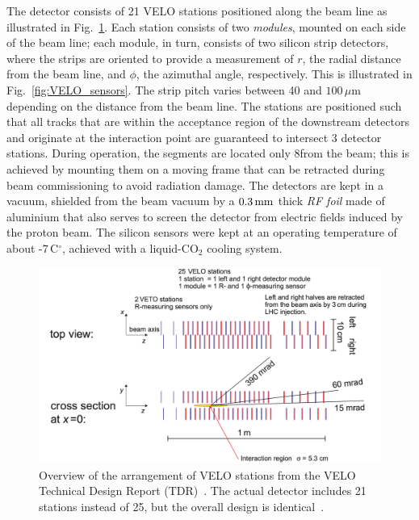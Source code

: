 The detector consists of 21 VELO stations positioned along the beam line as illustrated in Fig.~\ref{fig:VELO_stations}. Each station consists of two \emph{modules}, mounted on each side of the beam line; each module, in turn, consists of two silicon strip detectors,  where the strips are oriented to provide a measurement of $r$, the radial distance from the beam line, and  $\phi$, the azimuthal angle, respectively. This is illustrated in Fig.~\ref{fig:VELO_sensors}. The strip pitch varies between 40 and $100\,\mu$m depending on the distance from the beam line.  The stations are positioned such that all tracks that are within the acceptance region of the downstream detectors and originate at the interaction point are guaranteed to intersect 3 detector stations. During operation, the segments are located only 8\mm from the beam; this is achieved by mounting them on a moving frame that can be retracted during beam commissioning to avoid radiation damage. The detectors are kept in a vacuum, shielded from the beam vacuum by a $0.3\text{\,mm}$ thick \emph{RF foil} made of aluminium that also serves to screen the detector from electric fields induced by the proton beam. The silicon sensors were kept at an operating temperature of about -7\,C$^\circ$, achieved with a liquid-CO$_2$ cooling system.

\begin{figure}[tbp]
    \centering
    \includegraphics[width=0.95\columnwidth]{figures/detector/VELO_stations.png}
    \caption{Overview of the arrangement of VELO stations from the VELO Technical Design Report (TDR)~\cite{VELO-TDR}. The actual detector includes 21 stations instead of 25, but the overall design is identical~\cite{VELO-Performance}.}
    \label{fig:VELO_stations}
\end{figure}

